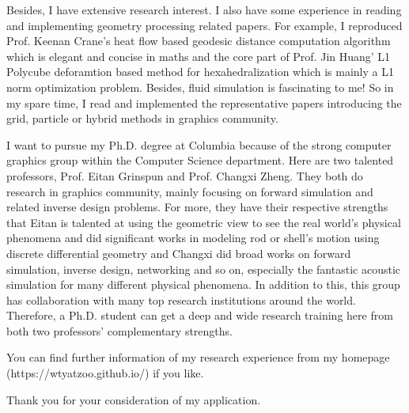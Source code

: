 \documentclass[a4paper,12pt]{article}
\begin{document}
Besides, I have extensive research interest. I also have some experience in reading and implementing geometry processing related papers. For example, I reproduced Prof. Keenan Crane's heat flow based geodesic distance computation algorithm which is elegant and concise in maths and the core part of Prof. Jin Huang' L1 Polycube deforamtion based method for hexahedralization which is mainly a L1 norm optimization problem. Besides, fluid simulation is fascinating to me! So in my spare time, I read and implemented the representative papers introducing the grid, particle or hybrid methods in graphics community. \vspace{1.2ex}

I want to pursue my Ph.D. degree at Columbia because of the strong computer graphics group within the Computer Science department. Here are two talented professors, Prof. Eitan Grinspun and Prof. Changxi Zheng. They both do research in graphics community, mainly focusing on forward simulation and related inverse design problems. For more, they have their respective strengths that Eitan is talented at using the geometric view to see the real world's physical phenomena and did significant works in modeling rod or shell's motion using discrete differential geometry and Changxi did broad works on forward simulation, inverse design, networking and so on, especially the fantastic acoustic simulation for many different physical phenomena. In addition to this, this group has collaboration with many top research institutions around the world. Therefore, a Ph.D. student can get a deep and wide research training here from both two professors' complementary strengths.\vspace{1.2ex} 

You can find further information of my research experience from my homepage\\(https://wtyatzoo.github.io/) if you like.\vspace{1.2ex}

Thank you for your consideration of my application.

\vspace{1.2ex}
\end{document}
